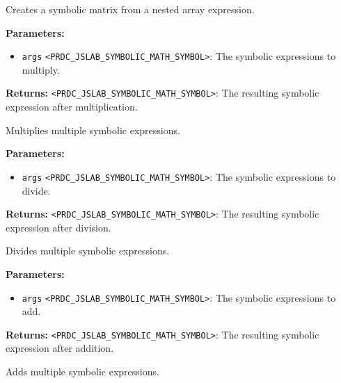 \documentclass[12pt,a4paper]{article}
\begin{document}
\noindent Creates a symbolic matrix from a nested array expression.

\vspace{5mm}
\noindent {}


\noindent \textbf{Parameters:}
\begin{itemize}
  \item \texttt{args} \texttt{<PRDC\_JSLAB\_SYMBOLIC\_MATH\_SYMBOL>}: The symbolic expressions to multiply.
\end{itemize}

\noindent \textbf{Returns:} \texttt{<PRDC\_JSLAB\_SYMBOLIC\_MATH\_SYMBOL>}: The resulting symbolic expression after multiplication.

\noindent Multiplies multiple symbolic expressions.

\vspace{5mm}
\noindent {}


\noindent \textbf{Parameters:}
\begin{itemize}
  \item \texttt{args} \texttt{<PRDC\_JSLAB\_SYMBOLIC\_MATH\_SYMBOL>}: The symbolic expressions to divide.
\end{itemize}

\noindent \textbf{Returns:} \texttt{<PRDC\_JSLAB\_SYMBOLIC\_MATH\_SYMBOL>}: The resulting symbolic expression after division.

\noindent Divides multiple symbolic expressions.

\vspace{5mm}
\noindent {}


\noindent \textbf{Parameters:}
\begin{itemize}
  \item \texttt{args} \texttt{<PRDC\_JSLAB\_SYMBOLIC\_MATH\_SYMBOL>}: The symbolic expressions to add.
\end{itemize}

\noindent \textbf{Returns:} \texttt{<PRDC\_JSLAB\_SYMBOLIC\_MATH\_SYMBOL>}: The resulting symbolic expression after addition.

\noindent Adds multiple symbolic expressions.
\end{document}
